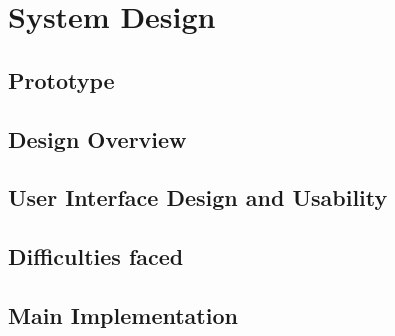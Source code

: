 \section {System Design}

\subsection{Prototype}

\subsection{Design Overview}

\subsection{User Interface Design and Usability}

\subsection{Difficulties faced}

\subsection{Main Implementation}
